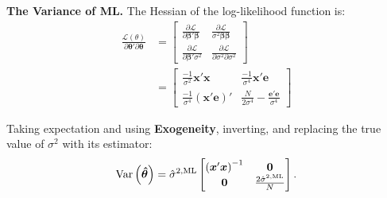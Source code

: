 \noindent \textbf{The Variance of ML.} The Hessian of the log-likelihood function is: 
\begin{align}
	\frac{ \mathcal{L} \left( \theta \right) } { \partial \bm{\theta}' \partial \bm{ \theta } } & = \begin{bmatrix}
 							\frac{ \partial \mathcal{L}  } { \partial \bm{\beta}' \bm{ \beta} } & \frac{ \partial \mathcal{L}  } { \sigma^2 \bm{\beta} \bm{ \beta} } \\ 
 							\frac{ \partial \mathcal{L}  } { \partial \bm{\beta}' \sigma^2 } & \frac{ \partial \mathcal{L}  } { \partial \sigma^2 \partial \sigma^2 }
 						\end{bmatrix} \nonumber \\
 					   & = \begin{bmatrix}
 					   			\frac{-1}{ \sigma^2} \bm{x}' \bm{x} & \frac{-1}{\sigma^4} \bm{x}' \bm{e}  \\
 					   			\frac{-1}{\sigma^4} \left( \bm{x}' \bm{e} \right) ' & \frac{N}{2 \sigma^4} - \frac{ \bm{e}' \bm{e} } { \sigma^4 } 
 					   	 	\end{bmatrix} 
\end{align}

\noindent Taking expectation and using \textbf{Exogeneity},  inverting, and replacing the true value of $\sigma^2$ with its estimator: 
\begin{align}
	\operatorname{Var} \left( \bm{\hat{\theta}} \right) = \hat{\sigma}^{2,\text{ML}} \begin{bmatrix}
 { \left( \bm{x}' \bm{x} \right) }^{-1} & \bm{0} \\
 \bm{0} & \frac{ 2 \hat{\sigma}^{2,\text{ML}} } { N}
 \end{bmatrix}. 
\end{align}



